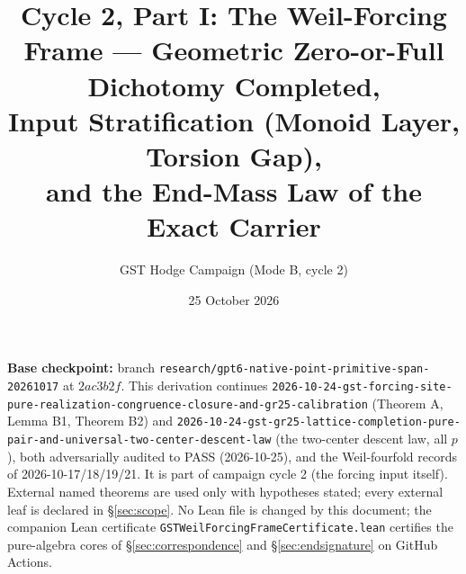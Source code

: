 \documentclass[11pt]{article}
\title{Cycle 2, Part I: The Weil-Forcing Frame --- Geometric Zero-or-Full Dichotomy Completed,\\
Input Stratification (Monoid Layer, Torsion Gap),\\
and the End-Mass Law of the Exact Carrier}
\author{GST Hodge Campaign (Mode B, cycle 2)}
\date{25 October 2026}
\begin{document}
\maketitle

\noindent\textbf{Base checkpoint:} branch \texttt{research/gpt6-native-point-primitive-span-20261017} at
$2ac3b2f$. This derivation continues
\texttt{2026-10-24-gst-forcing-site-pure-realization-congruence-closure-and-gr25-calibration} (Theorem A, Lemma B1,
Theorem B2) and \texttt{2026-10-24-gst-gr25-lattice-completion-pure-pair-and-universal-two-center-descent-law}
(the two-center descent law, all $p$), both adversarially audited to PASS (2026-10-25), and the Weil-fourfold records
of 2026-10-17/18/19/21. It is part of campaign cycle 2 (the forcing input itself). External named theorems are used only
with hypotheses stated; every external leaf is declared in \S\ref{sec:scope}. No Lean file is changed by this document;
the companion Lean certificate \texttt{GSTWeilForcingFrameCertificate.lean} certifies the pure-algebra cores of
\S\ref{sec:correspondence} and \S\ref{sec:endsignature} on GitHub Actions.
\end{document}
